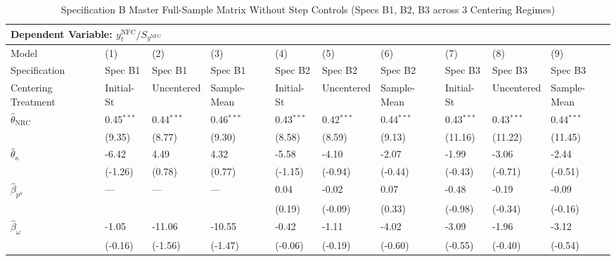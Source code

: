 \begin{landscape}
\begin{table}[H]
\centering
\caption{Specification B Master Full-Sample Matrix Without Step Controls (Specs B1, B2, B3 across 3 Centering Regimes)}
\label{tab:specB_fs_master_without_dummies}
\small
\begin{tabular}{p{4.8cm}p{1.3cm}p{1.3cm}p{1.3cm}p{1.3cm}p{1.3cm}p{1.3cm}p{1.3cm}p{1.3cm}p{1.3cm}}
\toprule
\multicolumn{10}{l}{\textbf{Dependent Variable: $y_t^{\text{NFC}} / S_{y^{\text{NFC}}}$}} \\
\midrule
Model & (1) & (2) & (3) & (4) & (5) & (6) & (7) & (8) & (9)  \\
Specification & Spec B1 & Spec B1 & Spec B1 & Spec B2 & Spec B2 & Spec B2 & Spec B3 & Spec B3 & Spec B3  \\
Centering Treatment & Initial-St & Uncentered & Sample-Mean & Initial-St & Uncentered & Sample-Mean & Initial-St & Uncentered & Sample-Mean  \\
\midrule
$\hat{\theta}_{\text{NRC}}$ & 0.45$^{***}$ & 0.44$^{***}$ & 0.46$^{***}$ & 0.43$^{***}$ & 0.42$^{***}$ & 0.44$^{***}$ & 0.43$^{***}$ & 0.43$^{***}$ & 0.44$^{***}$  \\
 & {\scriptsize (9.35)} & {\scriptsize (8.77)} & {\scriptsize (9.30)} & {\scriptsize (8.58)} & {\scriptsize (8.59)} & {\scriptsize (9.13)} & {\scriptsize (11.16)} & {\scriptsize (11.22)} & {\scriptsize (11.45)}  \\
$\hat{\theta}_{\kappa}$ & -6.42 & 4.49 & 4.32 & -5.58 & -4.10 & -2.07 & -1.99 & -3.06 & -2.44  \\
 & {\scriptsize (-1.26)} & {\scriptsize (0.78)} & {\scriptsize (0.77)} & {\scriptsize (-1.15)} & {\scriptsize (-0.94)} & {\scriptsize (-0.44)} & {\scriptsize (-0.43)} & {\scriptsize (-0.71)} & {\scriptsize (-0.51)}  \\
$\hat{\beta}_{p^{\kappa}}$ & --- & --- & --- & 0.04 & -0.02 & 0.07 & -0.48 & -0.19 & -0.09  \\
 &  &  &  & {\scriptsize (0.19)} & {\scriptsize (-0.09)} & {\scriptsize (0.33)} & {\scriptsize (-0.98)} & {\scriptsize (-0.34)} & {\scriptsize (-0.16)}  \\
$\hat{\beta}_{\omega}$ & -1.05 & -11.06 & -10.55 & -0.42 & -1.11 & -4.02 & -3.09 & -1.96 & -3.12  \\
 & {\scriptsize (-0.16)} & {\scriptsize (-1.56)} & {\scriptsize (-1.47)} & {\scriptsize (-0.06)} & {\scriptsize (-0.19)} & {\scriptsize (-0.60)} & {\scriptsize (-0.55)} & {\scriptsize (-0.40)} & {\scriptsize (-0.54)}  \\

\end{tabular}
\end{table}
\end{landscape}
